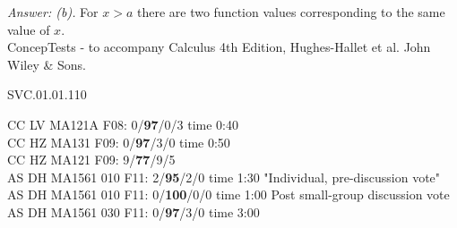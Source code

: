 {\it Answer: (b).} For $x>a$ there are two function values corresponding to the same value of $x$.\\

\medskip
ConcepTests - to accompany Calculus 4th Edition, Hughes-Hallet et al. John Wiley \& Sons.

SVC.01.01.110


CC LV MA121A F08: 0/{\bf 97}/0/3 time 0:40\\
CC HZ MA131 F09: 0/{\bf97}/3/0 time 0:50  \\
CC HZ MA121 F09: 9/{\bf77}/9/5  \\
AS DH MA1561 010 F11: 2/{\bf95}/2/0 time 1:30 "Individual, pre-discussion vote" \\
AS DH MA1561 010 F11: 0/{\bf100}/0/0 time 1:00 Post small-group discussion vote \\
AS DH MA1561 030 F11: 0/{\bf97}/3/0 time 3:00  \\

